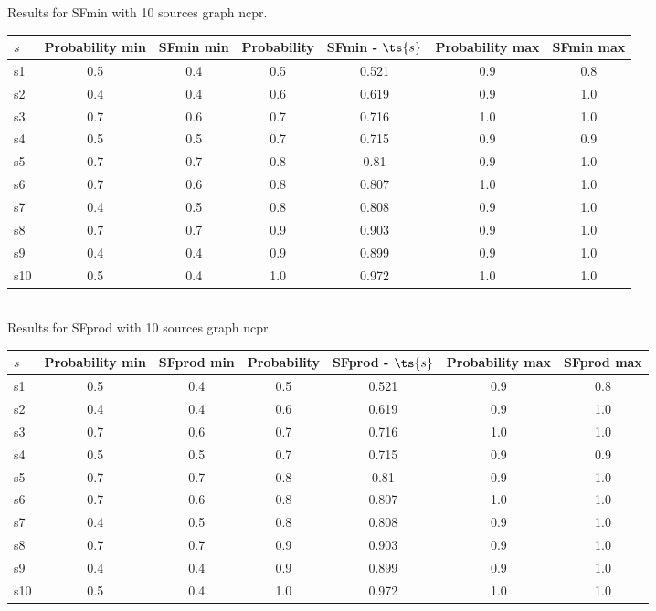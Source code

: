 \documentclass{article}
\begin{document}
\noindent Results for SFmin with 10 sources graph ncpr.

\noindent\begin{tabular}{|l|c|c|c|c|c|c|}
\hline
$s$& Probability min & SFmin min & Probability & SFmin - $\ts{s}$ & Probability max & SFmin max\\
\hline
s1 &0.5 & 0.4 & 0.5 & 0.521 & 0.9 & 0.8\\
\hline
s2 &0.4 & 0.4 & 0.6 & 0.619 & 0.9 & 1.0\\
\hline
s3 &0.7 & 0.6 & 0.7 & 0.716 & 1.0 & 1.0\\
\hline
s4 &0.5 & 0.5 & 0.7 & 0.715 & 0.9 & 0.9\\
\hline
s5 &0.7 & 0.7 & 0.8 & 0.81 & 0.9 & 1.0\\
\hline
s6 &0.7 & 0.6 & 0.8 & 0.807 & 1.0 & 1.0\\
\hline
s7 &0.4 & 0.5 & 0.8 & 0.808 & 0.9 & 1.0\\
\hline
s8 &0.7 & 0.7 & 0.9 & 0.903 & 0.9 & 1.0\\
\hline
s9 &0.4 & 0.4 & 0.9 & 0.899 & 0.9 & 1.0\\
\hline
s10 &0.5 & 0.4 & 1.0 & 0.972 & 1.0 & 1.0\\
\hline
\end{tabular}\\

\noindent Results for SFprod with 10 sources graph ncpr.

\noindent\begin{tabular}{|l|c|c|c|c|c|c|}
\hline
$s$& Probability min & SFprod min & Probability & SFprod - $\ts{s}$ & Probability max & SFprod max\\
\hline
s1 &0.5 & 0.4 & 0.5 & 0.521 & 0.9 & 0.8\\
\hline
s2 &0.4 & 0.4 & 0.6 & 0.619 & 0.9 & 1.0\\
\hline
s3 &0.7 & 0.6 & 0.7 & 0.716 & 1.0 & 1.0\\
\hline
s4 &0.5 & 0.5 & 0.7 & 0.715 & 0.9 & 0.9\\
\hline
s5 &0.7 & 0.7 & 0.8 & 0.81 & 0.9 & 1.0\\
\hline
s6 &0.7 & 0.6 & 0.8 & 0.807 & 1.0 & 1.0\\
\hline
s7 &0.4 & 0.5 & 0.8 & 0.808 & 0.9 & 1.0\\
\hline
s8 &0.7 & 0.7 & 0.9 & 0.903 & 0.9 & 1.0\\
\hline
s9 &0.4 & 0.4 & 0.9 & 0.899 & 0.9 & 1.0\\
\hline
s10 &0.5 & 0.4 & 1.0 & 0.972 & 1.0 & 1.0\\
\hline
\end{tabular}\\
\end{document}
